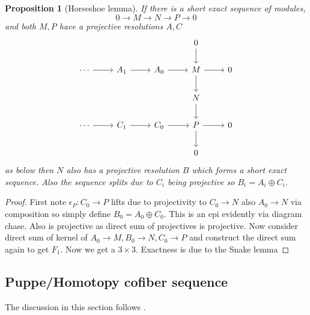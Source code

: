 \documentclass[12pt]{article}
\numberwithin{equation}{section}
\newcounter{dummy} \numberwithin{dummy}{section}
\newtheorem{proposition}[dummy]{Proposition}
\begin{document}
\begin{appendices}
	\begin{proposition}[Horseshoe lemma]
		If there is a short exact sequence of modules,
		\[ 0 \to M \to N \to P \to 0 \]
		and both $M,P$ have a projective resolutions $A, C$ 
		\[\begin{tikzcd}
			&&& 0 \\
			\cdots & {A_1} & {A_0} & M & 0 \\
			&&& N \\
			\cdots & {C_1} & {C_0} & P & 0 \\
			&&& 0
			\arrow[from=2-4, to=2-5]
			\arrow[from=1-4, to=2-4]
			\arrow[from=2-4, to=3-4]
			\arrow[from=3-4, to=4-4]
			\arrow[from=4-4, to=4-5]
			\arrow[from=4-4, to=5-4]
			\arrow[ from=4-3, to=4-4]
			\arrow[ from=2-3, to=2-4]
			\arrow[from=2-1, to=2-2]
			\arrow[from=2-2, to=2-3]
			\arrow[from=4-1, to=4-2]
			\arrow[from=4-2, to=4-3]
		\end{tikzcd}\]
		as below then $N$ also has a projective resolution $B$ which forms a short exact sequence. Also the sequence splits due to $C_i$ being projective so $B_i=A_i \oplus C_i$.
	\end{proposition}
	\begin{proof}
		First note $\epsilon_P: C_0 \to P$ lifts due to projectivity to $C_0 \to N$ also $A_0\to N$ via composition so simply define $B_0 = A_0 \oplus C_0$. This is an epi evidently via diagram chase. Also is projective as direct sum of projectives is projective. Now consider direct sum of kernel of $A_0 \to M, B_0 \to N, C_0 \to P$ and construct the direct sum again to get $F_1$.	Now we get a $3\times 3$. Exactness is due to the Snake lemma
	\end{proof}
	\subsection{Puppe/Homotopy cofiber sequence}
	The discussion in this section follows \cite{weibel_1994}.
	

\end{appendices}
\end{document}
